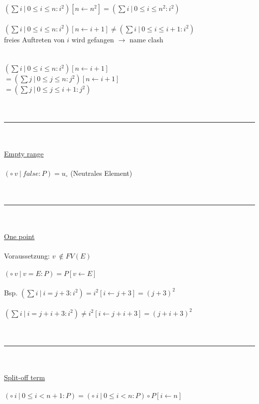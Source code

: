 \documentclass[18pt,a4paper]{article}
\newcommand{\tab}{\hspace*{2em}}
\begin{document}
$(\sum{i} \:\vert\: 0\leqslant i\leqslant n : i^2)[n\leftarrow n^2] = (\sum{i} \:\vert\: 0\leqslant i\leqslant n^2 : i^2)$\\
\\
$(\sum{i} \:\vert\: 0\leqslant i\leqslant n : i^2)[n\leftarrow i+1] \neq (\sum{i} \:\vert\: 0\leqslant i\leqslant i+1 : i^2)$\\
freies Auftreten von $i$ wird gefangen $\rightarrow$ name clash\\
\\
\\
$(\sum{i} \:\vert\: 0\leqslant i\leqslant n : i^2)[n\leftarrow i+1]$\\
$= (\sum{j} \:\vert\: 0\leqslant j\leqslant n : j^2)[n\leftarrow i+1]$\\
$= (\sum{j} \:\vert\: 0\leqslant j\leqslant i+1 : j^2)$\\
\\
\\
\rule{\textwidth}{0.4mm}\\
\\
\uline{Empty range}\\
\\
$(\circ \:v \:\vert\: false : P ) = u_\circ$ (Neutrales Element)\\
\\
\\
\rule{\textwidth}{0.4mm}\\
\\
\uline{One point}\\
\\
Voraussetzung: $v \:\notin FV(E)$\\
\\
$(\circ \:v \:\vert\: v = E : P ) = P[v\leftarrow E]$\\
\\
Bsp. $(\sum{i} \:\vert\: i = j + 3 : i^2) = i^2[i\leftarrow j+3] = (j+3)^2$\\
\\
\tab $(\sum{i} \:\vert\: i = j + i + 3 : i^2) \neq i^2[i\leftarrow j+i+3] = (j+i+3)^2$\\
\\
\\
\rule{\textwidth}{0.4mm}\\
\\
\uline{Split-off term}\\
\\
$(\circ \:i \:\vert\: 0\leqslant i < n+1 : P) = (\circ \:i \:\vert\: 0\leqslant i < n : P) \circ P[i\leftarrow n]$\\
\end{document}
